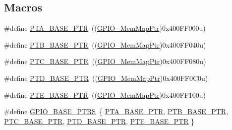 \subsection*{Macros}
\begin{DoxyCompactItemize}
\item 
\#define \hyperlink{group___g_p_i_o___peripheral_gadf98f6ee2bbfd42102e378a66b29b9ef}{P\+T\+A\+\_\+\+B\+A\+S\+E\+\_\+\+P\+T\+R}~((\hyperlink{group___g_p_i_o___peripheral_ga31c1eddda45aa085f51142987e05ada5}{G\+P\+I\+O\+\_\+\+Mem\+Map\+Ptr})0x400\+F\+F000u)
\item 
\#define \hyperlink{group___g_p_i_o___peripheral_ga59ab0f28e891ea28f152505ce2021747}{P\+T\+B\+\_\+\+B\+A\+S\+E\+\_\+\+P\+T\+R}~((\hyperlink{group___g_p_i_o___peripheral_ga31c1eddda45aa085f51142987e05ada5}{G\+P\+I\+O\+\_\+\+Mem\+Map\+Ptr})0x400\+F\+F040u)
\item 
\#define \hyperlink{group___g_p_i_o___peripheral_gaaa3dc05c2a51a960067e1de6863fd3dd}{P\+T\+C\+\_\+\+B\+A\+S\+E\+\_\+\+P\+T\+R}~((\hyperlink{group___g_p_i_o___peripheral_ga31c1eddda45aa085f51142987e05ada5}{G\+P\+I\+O\+\_\+\+Mem\+Map\+Ptr})0x400\+F\+F080u)
\item 
\#define \hyperlink{group___g_p_i_o___peripheral_gaa61d2c33375f3becbae1353eee4c1317}{P\+T\+D\+\_\+\+B\+A\+S\+E\+\_\+\+P\+T\+R}~((\hyperlink{group___g_p_i_o___peripheral_ga31c1eddda45aa085f51142987e05ada5}{G\+P\+I\+O\+\_\+\+Mem\+Map\+Ptr})0x400\+F\+F0\+C0u)
\item 
\#define \hyperlink{group___g_p_i_o___peripheral_gaa230685f72ad1540850ab8d12366775c}{P\+T\+E\+\_\+\+B\+A\+S\+E\+\_\+\+P\+T\+R}~((\hyperlink{group___g_p_i_o___peripheral_ga31c1eddda45aa085f51142987e05ada5}{G\+P\+I\+O\+\_\+\+Mem\+Map\+Ptr})0x400\+F\+F100u)
\item 
\#define \hyperlink{group___g_p_i_o___peripheral_gad0f7206167a584b1e75a81a5c30fa1c2}{G\+P\+I\+O\+\_\+\+B\+A\+S\+E\+\_\+\+P\+T\+R\+S}~\{ \hyperlink{group___g_p_i_o___peripheral_gadf98f6ee2bbfd42102e378a66b29b9ef}{P\+T\+A\+\_\+\+B\+A\+S\+E\+\_\+\+P\+T\+R}, \hyperlink{group___g_p_i_o___peripheral_ga59ab0f28e891ea28f152505ce2021747}{P\+T\+B\+\_\+\+B\+A\+S\+E\+\_\+\+P\+T\+R}, \hyperlink{group___g_p_i_o___peripheral_gaaa3dc05c2a51a960067e1de6863fd3dd}{P\+T\+C\+\_\+\+B\+A\+S\+E\+\_\+\+P\+T\+R}, \hyperlink{group___g_p_i_o___peripheral_gaa61d2c33375f3becbae1353eee4c1317}{P\+T\+D\+\_\+\+B\+A\+S\+E\+\_\+\+P\+T\+R}, \hyperlink{group___g_p_i_o___peripheral_gaa230685f72ad1540850ab8d12366775c}{P\+T\+E\+\_\+\+B\+A\+S\+E\+\_\+\+P\+T\+R} \}
\end{DoxyCompactItemize}
